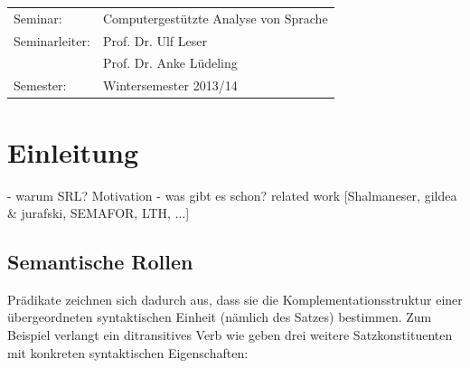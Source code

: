 \documentclass[12pt]{article}
\begin{document}
\begin{center}
\begin{Large}
		\begin{table}[h]
			\Large
			\centering
			\begin{tabular}{l l}
				Seminar: & Computergestützte Analyse von Sprache\\
				Seminarleiter: & Prof. Dr. Ulf Leser\\
				 		    & Prof. Dr. Anke Lüdeling \\
				Semester: & Wintersemester 2013/14 				 	
			\end{tabular}
		\end{table}	
	\end{Large}
	\vspace*{\fill}
\end{center}


\pagestyle{fancy} %
\fancyhf{} %
\renewcommand{\headrulewidth}{0pt} %
\renewcommand{\footrulewidth}{0pt} %
\fancyfoot[C]{\thepage} %

 \newpage
 \tableofcontents
 \vspace{1cm}
 \listoffigures
 \vspace{1cm}
 \listoftables

\newpage
{}

\section{Einleitung}
- warum SRL? Motivation
- was gibt es schon? related work
[Shalmaneser, gildea \& jurafski, SEMAFOR, LTH, ...]
\subsection{Semantische Rollen}

Prädikate zeichnen sich dadurch aus, dass sie die Komplementationsstruktur einer
übergeordneten syntaktischen Einheit (nämlich des Satzes) bestimmen. Zum
Beispiel verlangt ein ditransitives Verb wie \glqq{}geben\grqq{} drei weitere Satzkonstituenten mit konkreten syntaktischen Eigenschaften:

\begin{center}
\end{center}
\end{document}
